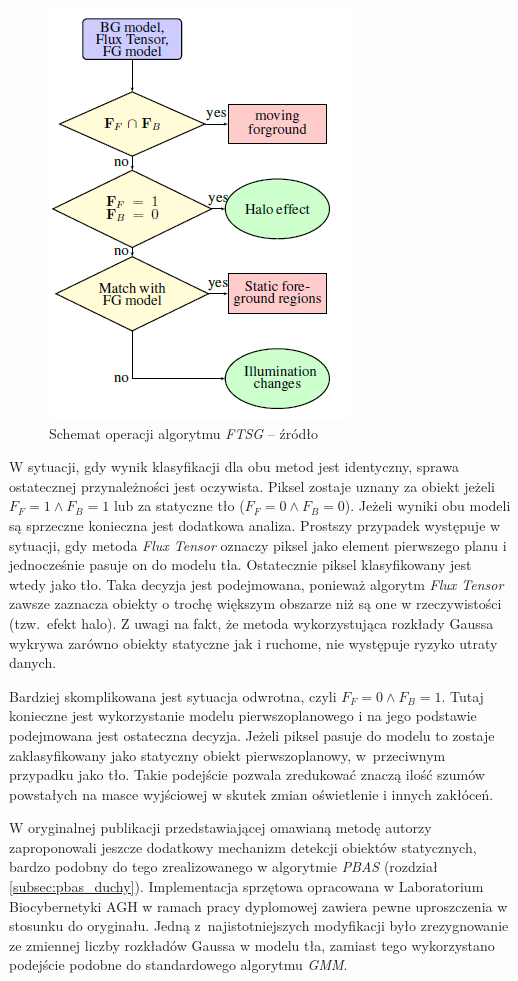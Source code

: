 		\begin{figure}[h]
				\centering
				\includegraphics[scale=0.8]{img/3/ftsg_flow.png}
				\caption{Schemat operacji algorytmu \textit{FTSG} -- źródło \cite{wang_14}}
				\label{fig:ftsg_flow}
		\end{figure}

W sytuacji, gdy wynik klasyfikacji dla obu metod jest identyczny, sprawa ostatecznej przynależności jest oczywista. Piksel zostaje uznany za obiekt jeżeli $F_F = 1 \land F_B = 1$ lub za statyczne tło ($F_F = 0 \land F_B = 0$). Jeżeli wyniki obu modeli są sprzeczne konieczna jest dodatkowa analiza. Prostszy przypadek występuje w sytuacji, gdy metoda \textit{Flux Tensor} oznaczy piksel jako element pierwszego planu i jednocześnie pasuje on do modelu tła. Ostatecznie piksel klasyfikowany jest wtedy jako tło. Taka decyzja jest podejmowana, ponieważ algorytm \textit{Flux Tensor} zawsze zaznacza obiekty o trochę większym obszarze niż są one w rzeczywistości (tzw.~efekt halo). Z uwagi na fakt, że metoda wykorzystująca rozkłady Gaussa wykrywa zarówno obiekty statyczne jak i ruchome, nie występuje ryzyko utraty danych.

Bardziej skomplikowana jest sytuacja odwrotna, czyli $F_F = 0 \land F_B = 1$. Tutaj konieczne jest wykorzystanie modelu pierwszoplanowego i na jego podstawie podejmowana jest ostateczna decyzja. Jeżeli piksel pasuje do modelu to zostaje zaklasyfikowany jako statyczny obiekt pierwszoplanowy, w~przeciwnym przypadku jako tło. Takie podejście pozwala zredukować znaczą ilość szumów powstałych na masce wyjściowej w skutek zmian oświetlenie i innych zakłóceń.

W oryginalnej publikacji przedstawiającej omawianą metodę \cite{wang_14} autorzy zaproponowali jeszcze dodatkowy mechanizm detekcji obiektów statycznych, bardzo podobny do tego zrealizowanego w algorytmie \textit{PBAS} (rozdział \ref{subsec:pbas_duchy}). Implementacja sprzętowa opracowana w Laboratorium Biocybernetyki AGH w ramach pracy dyplomowej \cite{janus_15} zawiera pewne uproszczenia w stosunku do oryginału. Jedną z~najistotniejszych modyfikacji było zrezygnowanie ze zmiennej liczby rozkładów Gaussa w modelu tła, zamiast tego wykorzystano podejście podobne do standardowego algorytmu \textit{GMM}.